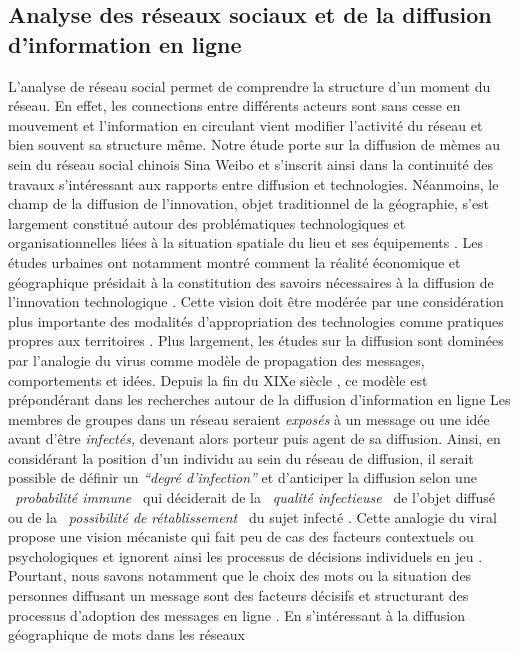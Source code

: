 

\subsection[Analyse de réseaux sociaux et de la diffusion d'information en ligne]{Analyse des réseaux sociaux et de la diffusion d'information en ligne}

L{\textquoteright}analyse de réseau social permet de comprendre la structure d{\textquoteright}un moment du réseau. En effet, les connections entre différents acteurs sont sans cesse en mouvement et l{\textquoteright}information en circulant vient modifier l{\textquoteright}activité du réseau et bien souvent sa structure m\^eme. Notre étude porte sur la diffusion de mèmes au sein du réseau social chinois Sina Weibo et s{\textquoteright}inscrit ainsi dans la continuité des travaux s{\textquoteright}intéressant aux rapports entre diffusion et technologies. Néanmoins, le champ de la diffusion de l{\textquoteright}innovation, objet traditionnel de la géographie, s{\textquoteright}est largement constitué autour des problématiques technologiques et organisationnelles liées à la situation spatiale du lieu et ses équipements \citep{Crevoisier2004}. Les études urbaines ont notamment montré comment la réalité économique et géographique présidait à la constitution des savoirs nécessaires à la diffusion de l{\textquoteright}innovation technologique \citep{Howells2002}. Cette vision doit \^etre modérée par une considération plus importante des modalités d{\textquoteright}appropriation des technologies comme pratiques propres aux territoires \citep{Fernandez2010}. Plus largement, les études sur la diffusion sont dominées par l{\textquoteright}analogie du virus comme modèle de propagation des messages, comportements et idées. Depuis la fin du XIXe siècle \citep{LeBon1895}, ce modèle est prépondérant dans les recherches autour de la diffusion d{\textquoteright}information en ligne \citep{Goel2012} Les membres de groupes dans un réseau seraient \textit{exposés }à un message ou une idée avant d{\textquoteright}\^etre \textit{infectés, }devenant alors porteur puis agent de sa diffusion. Ainsi, en considérant la position d{\textquoteright}un individu au sein du réseau de diffusion, il serait possible de définir un \textit{{\textquotedblleft}}\textit{degré d{\textquoteright}infection{\textquotedblright}} \citep{Cheng2013} et d{\textquoteright}anticiper la diffusion selon une \textit{{\guillemotleft}~probabilité immune~{\guillemotright} }qui\textit{ }déciderait de la \textit{{\guillemotleft}~qualité infectieuse~{\guillemotright} }de l{\textquoteright}objet diffusé ou de la \textit{{\guillemotleft}~possibilité de }\textit{rétablissement~{\guillemotright} }du sujet infecté \citep{Wang2011}. Cette analogie du viral propose une vision mécaniste qui fait peu de cas des facteurs contextuels ou psychologiques et ignorent ainsi les processus de décisions individuels en jeu \citep{Jackson2010}. Pourtant, nous savons notamment que le choix des mots ou la situation des personnes diffusant un message sont des facteurs décisifs et structurant des processus d{\textquoteright}adoption des messages en ligne \citep{Conover2013}.  En s{\textquoteright}intéressant à la diffusion géographique de mots dans les réseaux 
